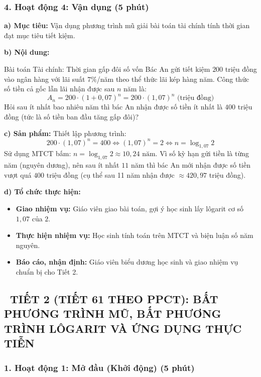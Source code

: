\documentclass[12pt, a4paper]{article}
\begin{document}
\subsubsection*{4. Hoạt động 4: Vận dụng (5 phút)}

\noindent \textbf{a) Mục tiêu:}
Vận dụng phương trình mũ giải bài toán tài chính tính thời gian đạt mục tiêu tiết kiệm.

\noindent \textbf{b) Nội dung:}
\begin{pedabox}{Bài toán Tài chính: Thời gian gấp đôi số vốn}
Bác An gửi tiết kiệm $200$ triệu đồng vào ngân hàng với lãi suất $7\%$/năm theo thể thức lãi kép hàng năm. Công thức số tiền cả gốc lẫn lãi nhận được sau $n$ năm là:
$$A_n = 200 \cdot (1 + 0{,}07)^n = 200 \cdot (1{,}07)^n\text{ (triệu đồng)}$$
Hỏi sau ít nhất bao nhiêu năm thì bác An nhận được số tiền ít nhất là $400$ triệu đồng (tức là số tiền ban đầu tăng gấp đôi)?
\end{pedabox}

\noindent \textbf{c) Sản phẩm:}
Thiết lập phương trình:
$$200 \cdot (1{,}07)^n = 400 \iff (1{,}07)^n = 2 \iff n = \log_{1{,}07} 2$$
Sử dụng MTCT bấm: $n = \log_{1{,}07} 2 \approx 10{,}24\text{ năm}$.
Vì số kỳ hạn gửi tiền là từng năm (nguyên dương), nên sau ít nhất $11$ năm thì bác An mới nhận được số tiền vượt quá $400$ triệu đồng (cụ thể sau 11 năm nhận được $\approx 420{,}97$ triệu đồng).

\noindent \textbf{d) Tổ chức thực hiện:}
\begin{itemize}[leftmargin=0.6cm]
    \item \textbf{Giao nhiệm vụ:} Giáo viên giao bài toán, gợi ý học sinh lấy lôgarit cơ số $1{,}07$ của $2$.
    \item \textbf{Thực hiện nhiệm vụ:} Học sinh tính toán trên MTCT và biện luận số năm nguyên.
    \item \textbf{Báo cáo, nhận định:} Giáo viên biểu dương học sinh và giao nhiệm vụ chuẩn bị cho Tiết 2.
\end{itemize}

\vspace{10pt}

\subsection*{\faClockO \ TIẾT 2 (TIẾT 61 THEO PPCT): BẤT PHƯƠNG TRÌNH MŨ, BẤT PHƯƠNG TRÌNH LÔGARIT VÀ ỨNG DỤNG THỰC TIỄN}

\subsubsection*{1. Hoạt động 1: Mở đầu (Khởi động) (5 phút)}
\end{document}
